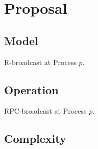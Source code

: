 
\section{Proposal}
\label{sec:proposal}

\subsection{Model}

\begin{algorithm}[h]
  
  \caption{\label{algo:reliablebroadcast}R-broadcast at Process $p$.}
\end{algorithm}

\subsection{Operation}

\begin{algorithm}[h]
  
  \caption{\label{algo:rpcbroadcast}RPC-broadcast at Process $p$.}
\end{algorithm}

\subsection{Complexity}


